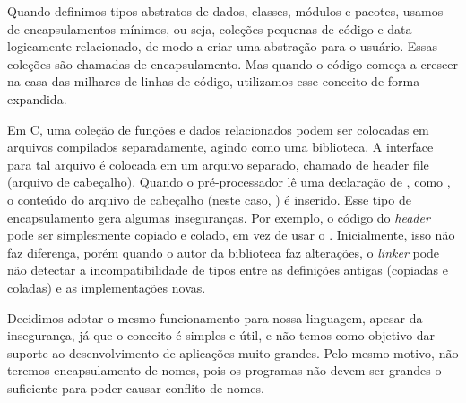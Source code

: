 Quando definimos tipos abstratos de dados, classes, módulos
e pacotes, usamos de encapsulamentos  mínimos, ou seja, coleções pequenas
de código e data logicamente relacionado, de modo a criar uma abstração
para o usuário. Essas coleções são chamadas de encapsulamento.
Mas quando o código começa a crescer na casa das milhares de linhas de
código, utilizamos esse conceito de forma expandida.

Em C, uma coleção de funções e dados relacionados podem ser colocadas em
arquivos compilados separadamente, agindo como uma biblioteca. A interface para
tal arquivo é colocada em um arquivo separado, chamado de header file (arquivo
de cabeçalho). Quando o pré-processador lê uma declaração de
, como , o conteúdo do
arquivo de cabeçalho (neste caso, ) é inserido. Esse
tipo de encapsulamento gera algumas inseguranças. Por exemplo, o código do
\emph{header} pode ser simplesmente copiado e colado, em vez de usar o
. Inicialmente, isso não faz diferença, porém quando o
autor da biblioteca faz alterações, o \emph{linker} pode não detectar a
incompatibilidade de tipos entre as definições antigas (copiadas e coladas) e
as implementações novas.

Decidimos adotar o mesmo funcionamento para nossa linguagem, apesar da
insegurança, já que o conceito é simples e útil, e não temos como objetivo dar
suporte ao desenvolvimento de aplicações muito grandes. Pelo mesmo motivo, não
teremos encapsulamento de nomes, pois os programas não devem ser grandes o
suficiente para poder causar conflito de nomes.